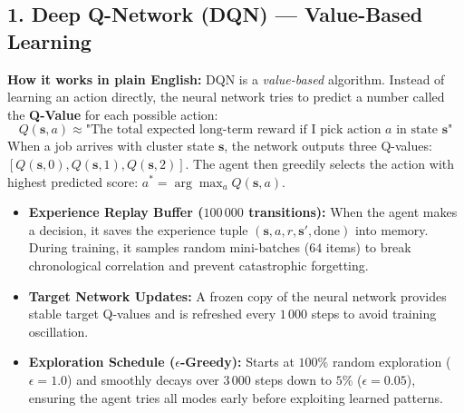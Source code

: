 \documentclass[11pt,a4paper]{article}
\begin{document}
\subsection{1. Deep Q-Network (DQN) --- Value-Based Learning}
\textbf{How it works in plain English:} 
DQN is a \textit{value-based} algorithm. Instead of learning an action directly, the neural network tries to predict a number called the \textbf{Q-Value} for each possible action:
\begin{equation*}
    Q(\mathbf{s}, a) \approx \text{"The total expected long-term reward if I pick action } a \text{ in state } \mathbf{s}\text{"}
\end{equation*}
When a job arrives with cluster state $\mathbf{s}$, the network outputs three Q-values: $[Q(\mathbf{s}, 0), Q(\mathbf{s}, 1), Q(\mathbf{s}, 2)]$. The agent then greedily selects the action with highest predicted score: $a^* = \arg\max_a Q(\mathbf{s}, a)$.
\begin{itemize}[noitemsep, topsep=1pt]
    \item \textbf{Experience Replay Buffer ($100\,000$ transitions):} When the agent makes a decision, it saves the experience tuple $(\mathbf{s}, a, r, \mathbf{s}', \text{done})$ into memory. During training, it samples random mini-batches ($64$ items) to break chronological correlation and prevent catastrophic forgetting.
    \item \textbf{Target Network Updates:} A frozen copy of the neural network provides stable target Q-values and is refreshed every $1\,000$ steps to avoid training oscillation.
    \item \textbf{Exploration Schedule ($\epsilon$-Greedy):} Starts at $100\%$ random exploration ($\epsilon = 1.0$) and smoothly decays over $3\,000$ steps down to $5\%$ ($\epsilon = 0.05$), ensuring the agent tries all modes early before exploiting learned patterns.
\end{itemize}
\end{document}
